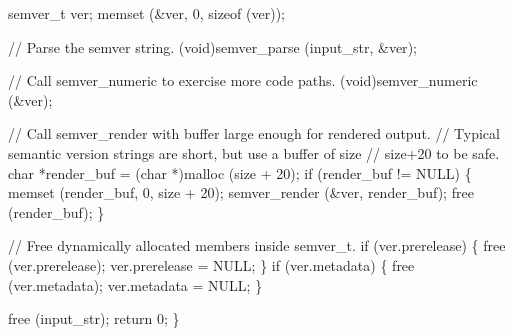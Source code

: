 \documentclass[
  a4paper,
]{scrreprt}
\newenvironment{Shaded}{\begin{snugshade}}{\end{snugshade}}
\newcommand{\CommentTok}[1]{\textcolor[rgb]{0.41,0.41,0.41}{#1}}
\newcommand{\ControlFlowTok}[1]{\textcolor[rgb]{0.85,0.12,0.09}{#1}}
\newcommand{\DataTypeTok}[1]{\textcolor[rgb]{0.47,0.16,0.63}{#1}}
\newcommand{\DecValTok}[1]{\textcolor[rgb]{0.47,0.16,0.63}{#1}}
\newcommand{\KeywordTok}[1]{\textcolor[rgb]{0.85,0.12,0.09}{#1}}
\newcommand{\NormalTok}[1]{\textcolor[rgb]{0.33,0.33,0.33}{#1}}
\newcommand{\OperatorTok}[1]{\textcolor[rgb]{0.00,0.46,0.62}{#1}}
\theoremstyle{definition}
\theoremstyle{remark}
\begin{document}
\begin{Shaded}
\begin{Highlighting}[numbers=left,,]
\NormalTok{  semver\_t ver}\OperatorTok{;}
\NormalTok{  memset }\OperatorTok{(\&}\NormalTok{ver}\OperatorTok{,} \DecValTok{0}\OperatorTok{,} \KeywordTok{sizeof} \OperatorTok{(}\NormalTok{ver}\OperatorTok{));}

  \CommentTok{// Parse the semver string.}
  \OperatorTok{(}\DataTypeTok{void}\OperatorTok{)}\NormalTok{semver\_parse }\OperatorTok{(}\NormalTok{input\_str}\OperatorTok{,} \OperatorTok{\&}\NormalTok{ver}\OperatorTok{);}

  \CommentTok{// Call semver\_numeric to exercise more code paths.}
  \OperatorTok{(}\DataTypeTok{void}\OperatorTok{)}\NormalTok{semver\_numeric }\OperatorTok{(\&}\NormalTok{ver}\OperatorTok{);}

  \CommentTok{// Call semver\_render with buffer large enough for rendered output.}
  \CommentTok{// Typical semantic version strings are short, but use a buffer of size}
  \CommentTok{// size+20 to be safe.}
  \DataTypeTok{char} \OperatorTok{*}\NormalTok{render\_buf }\OperatorTok{=} \OperatorTok{(}\DataTypeTok{char} \OperatorTok{*)}\NormalTok{malloc }\OperatorTok{(}\NormalTok{size }\OperatorTok{+} \DecValTok{20}\OperatorTok{);}
  \ControlFlowTok{if} \OperatorTok{(}\NormalTok{render\_buf }\OperatorTok{!=}\NormalTok{ NULL}\OperatorTok{)}
    \OperatorTok{\{}
\NormalTok{      memset }\OperatorTok{(}\NormalTok{render\_buf}\OperatorTok{,} \DecValTok{0}\OperatorTok{,}\NormalTok{ size }\OperatorTok{+} \DecValTok{20}\OperatorTok{);}
\NormalTok{      semver\_render }\OperatorTok{(\&}\NormalTok{ver}\OperatorTok{,}\NormalTok{ render\_buf}\OperatorTok{);}
\NormalTok{      free }\OperatorTok{(}\NormalTok{render\_buf}\OperatorTok{);}
    \OperatorTok{\}}

  \CommentTok{// Free dynamically allocated members inside semver\_t.}
  \ControlFlowTok{if} \OperatorTok{(}\NormalTok{ver}\OperatorTok{.}\NormalTok{prerelease}\OperatorTok{)}
    \OperatorTok{\{}
\NormalTok{      free }\OperatorTok{(}\NormalTok{ver}\OperatorTok{.}\NormalTok{prerelease}\OperatorTok{);}
\NormalTok{      ver}\OperatorTok{.}\NormalTok{prerelease }\OperatorTok{=}\NormalTok{ NULL}\OperatorTok{;}
    \OperatorTok{\}}
  \ControlFlowTok{if} \OperatorTok{(}\NormalTok{ver}\OperatorTok{.}\NormalTok{metadata}\OperatorTok{)}
    \OperatorTok{\{}
\NormalTok{      free }\OperatorTok{(}\NormalTok{ver}\OperatorTok{.}\NormalTok{metadata}\OperatorTok{);}
\NormalTok{      ver}\OperatorTok{.}\NormalTok{metadata }\OperatorTok{=}\NormalTok{ NULL}\OperatorTok{;}
    \OperatorTok{\}}

\NormalTok{  free }\OperatorTok{(}\NormalTok{input\_str}\OperatorTok{);}
  \ControlFlowTok{return} \DecValTok{0}\OperatorTok{;}
\OperatorTok{\}}
\end{Highlighting}
\end{Shaded}
\end{document}
